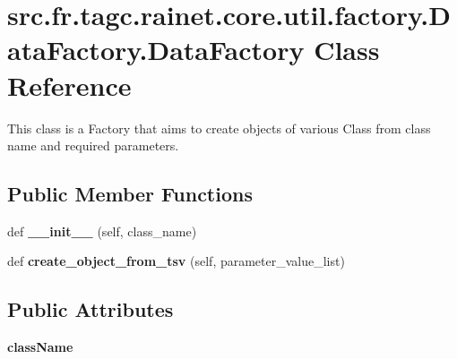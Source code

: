 \hypertarget{classsrc_1_1fr_1_1tagc_1_1rainet_1_1core_1_1util_1_1factory_1_1DataFactory_1_1DataFactory}{}\section{src.\+fr.\+tagc.\+rainet.\+core.\+util.\+factory.\+Data\+Factory.\+Data\+Factory Class Reference}
\label{classsrc_1_1fr_1_1tagc_1_1rainet_1_1core_1_1util_1_1factory_1_1DataFactory_1_1DataFactory}


This class is a Factory that aims to create objects of various Class from class name and required parameters.  


\subsection*{Public Member Functions}
\begin{DoxyCompactItemize}
\item 
\hypertarget{classsrc_1_1fr_1_1tagc_1_1rainet_1_1core_1_1util_1_1factory_1_1DataFactory_1_1DataFactory_a7eac68a775d0a65553ac0f9d67d45909}{}def {\bfseries \+\_\+\+\_\+init\+\_\+\+\_\+} (self, class\+\_\+name)\label{classsrc_1_1fr_1_1tagc_1_1rainet_1_1core_1_1util_1_1factory_1_1DataFactory_1_1DataFactory_a7eac68a775d0a65553ac0f9d67d45909}

\item 
\hypertarget{classsrc_1_1fr_1_1tagc_1_1rainet_1_1core_1_1util_1_1factory_1_1DataFactory_1_1DataFactory_aecea6798b72aa71c925657df3bfc31b4}{}def {\bfseries create\+\_\+object\+\_\+from\+\_\+tsv} (self, parameter\+\_\+value\+\_\+list)\label{classsrc_1_1fr_1_1tagc_1_1rainet_1_1core_1_1util_1_1factory_1_1DataFactory_1_1DataFactory_aecea6798b72aa71c925657df3bfc31b4}

\end{DoxyCompactItemize}
\subsection*{Public Attributes}
\begin{DoxyCompactItemize}
\item 
\hypertarget{classsrc_1_1fr_1_1tagc_1_1rainet_1_1core_1_1util_1_1factory_1_1DataFactory_1_1DataFactory_a8d69a0748871157a2bba26ca797d4302}{}{\bfseries class\+Name}\label{classsrc_1_1fr_1_1tagc_1_1rainet_1_1core_1_1util_1_1factory_1_1DataFactory_1_1DataFactory_a8d69a0748871157a2bba26ca797d4302}

\end{DoxyCompactItemize}


